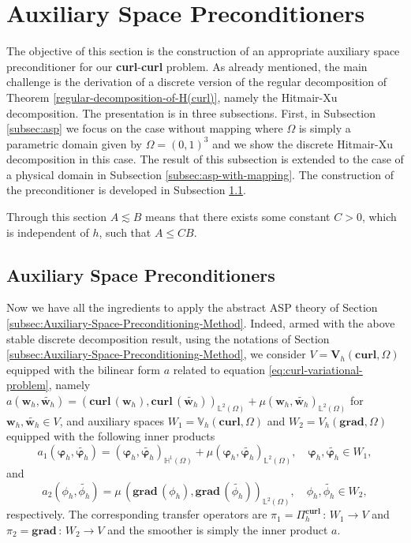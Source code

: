 \section{Auxiliary Space Preconditioners}\label{sec:asp}
The objective of this section is the construction of an appropriate auxiliary space preconditioner for our \textbf{curl}-\textbf{curl} problem. As already mentioned, the main challenge is the derivation of a discrete version of the regular decomposition of Theorem \ref{regular-decomposition-of-H(curl)}, namely the Hitmair-Xu decomposition. The presentation is in three subsections. First, in Subsection \ref{subsec:asp} we focus on the case without mapping where $\Omega$ is simply a parametric domain given by $\Omega=(0,1)^3$ and we show the discrete Hitmair-Xu decomposition in this case. The result of this subsection is extended to the case of a physical domain in Subsection \ref{subsec:asp-with-mapping}. The construction of the preconditioner is developed in Subsection \ref{subsec:construction-of-ASP}.



Through this section $A \lesssim B$ means that there exists some constant $C>0$, which is independent of $h$, such that $A \leq CB$.
 
\subsection{Auxiliary Space Preconditioners}\label{subsec:construction-of-ASP}
Now we have all the ingredients to apply the abstract ASP theory of Section \ref{subsec:Auxiliary-Space-Preconditioning-Method}. Indeed, armed with the above stable discrete decomposition result, using the notations of Section \ref{subsec:Auxiliary-Space-Preconditioning-Method}, we consider $V=\bm{V}_h(\textbf{curl},\Omega)$ equipped with the bilinear form $a$ related to equation \eqref{eq:curl-variational-problem}, namely $a(\bm{w}_h,\widetilde{\bm{w}_h})= \left(\textbf{curl}\,(\bm{w}_h),\textbf{curl}\,(\widetilde{\bm{w}_h})\right)_{\mathbb{L}^2(\Omega)} + \mu (\bm{w}_h,\widetilde{\bm{w}_h})_{\mathbb{L}^2(\Omega)}$ for $\bm{w}_h, \widetilde{\bm{w}_h} \in V$, and auxiliary spaces $W_1= \mathbb{V}_h(\textbf{curl},\Omega)$ and $W_2=V_h(\textbf{grad},\Omega)$ equipped with the following inner products
\begin{equation*}
a_1(\bm{\varphi}_h,\widetilde{\bm{\varphi}_h})= (\bm{\varphi}_h,\widetilde{\bm{\varphi}_h})_{\mathbb{H}^1(\Omega)} + \mu (\bm{\varphi}_h,\widetilde{\bm{\varphi}_h})_{\mathbb{L}^2(\Omega)}, \quad \bm{\varphi}_h,\widetilde{\bm{\varphi}_h} \in W_1,
\end{equation*}
and
\begin{equation*}
a_2(\phi_h,\widetilde{\phi_h})= \mu \, (\textbf{grad}\,(\phi_h),\textbf{grad}\,(\widetilde{\phi_h}))_{\mathbb{L}^2(\Omega)},  \quad \phi_h,\widetilde{\phi_h} \in W_2,
\end{equation*}
respectively. The corresponding transfer operators are $\pi_1 = \Pi_h^{\textbf{curl}}\,:\, W_1 \longrightarrow V$ and $\pi_2=\textbf{grad}\,:\, W_2 \longrightarrow V$ and the smoother is simply the inner product $a$. 

